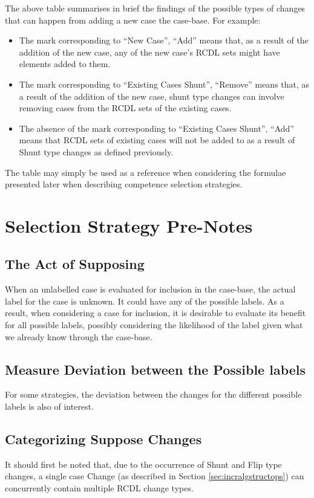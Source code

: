 \documentclass[a4paper,11pt]{report}
\begin{document}
\vspace{12pt}

The above table summarises in brief the findings of the possible types of changes that can happen from adding a new case the case-base. For example:
\begin{itemize}
	\item The mark corresponding to ``New Case'', ``Add'' means that, as a result of the addition of the new case, any of the new case's RCDL sets might have elements added to them.
	\item The mark corresponding to ``Existing Cases Shunt'', ``Remove'' means that, as a result of the addition of the new case, shunt type changes can involve removing cases from the RCDL sets of the existing cases.
	\item The absence of the mark corresponding to ``Existing Cases Shunt'', ``Add'' means that RCDL sets of existing cases will not be added to as a result of Shunt type changes as defined previously.
\end{itemize}

The table may simply be used as a reference when considering the formulae presented later when describing competence selection strategies.

\section{Selection Strategy Pre-Notes}
\subsection{The Act of Supposing\label{sec:actofsupposing}}
When an unlabelled case is evaluated for inclusion in the case-base, the actual label for the case is unknown. It could have any of the possible labels. As a result, when considering a case for inclusion, it is desirable to evaluate its benefit for all possible labels, possibly considering the likelihood of the label given what we already know through the case-base.

\subsection{Measure Deviation between the Possible labels}
For some strategies, the deviation between the changes for the different possible labels is also of interest.

\subsection{Categorizing Suppose Changes}
It should first be noted that, due to the occurrence of Shunt and Flip type changes, a single case Change (as described in Section \ref{sec:incralgstructops}) can concurrently contain multiple RCDL change types.
\end{document}
